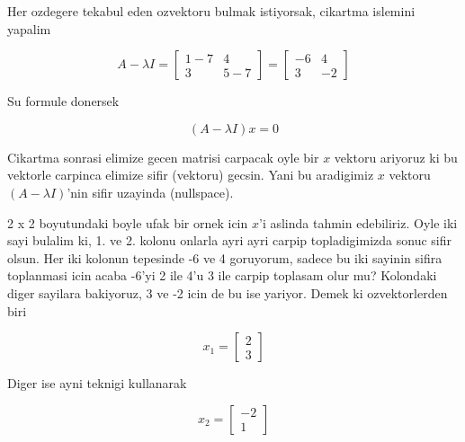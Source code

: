 \documentclass[12pt,fleqn]{article}
\begin{document}
Her ozdegere tekabul eden ozvektoru bulmak istiyorsak, cikartma islemini
yapalim

\[ 
A - \lambda I = 
\left[\begin{array}{rr}
1-7 & 4 \\ 3 & 5-7
\end{array}\right] = 
\left[\begin{array}{rr}
-6 & 4 \\ 3 & -2
\end{array}\right]
 \]

Su formule donersek

\[ (A - \lambda I) x = 0 \]

Cikartma sonrasi elimize gecen matrisi carpacak oyle bir $x$ vektoru
ariyoruz ki bu vektorle carpinca elimize sifir (vektoru) gecsin. Yani bu
aradigimiz $x$ vektoru $(A - \lambda I)$'nin sifir uzayinda (nullspace). 

2 x 2 boyutundaki boyle ufak bir ornek icin $x$'i aslinda tahmin
edebiliriz. Oyle iki sayi bulalim ki, 1. ve 2. kolonu onlarla ayri ayri
carpip topladigimizda sonuc sifir olsun. Her iki kolonun tepesinde -6 ve 4
goruyorum, sadece bu iki sayinin sifira toplanmasi icin acaba -6'yi 2 ile
4'u 3 ile carpip toplasam olur mu? Kolondaki diger sayilara bakiyoruz, 3 ve
-2 icin de bu ise yariyor. Demek ki ozvektorlerden biri 

\[ x_1 = 
\left[\begin{array}{r}
2 \\ 3
\end{array}\right]
 \]

Diger ise ayni teknigi kullanarak

\[ x_2 = 
\left[\begin{array}{r}
-2 \\ 1
\end{array}\right]
 \]
\end{document}
